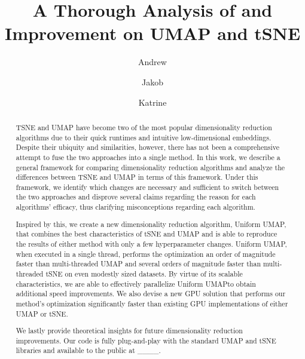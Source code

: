 \documentclass[sigconf, nonacm]{acmart}
\newcommand\ourmethod{Uniform UMAP}
\begin{document}
\title{A Thorough Analysis of and Improvement on UMAP and tSNE}

\author{Andrew}
\author{Jakob}
\author{Katrine}
\begin{abstract}
TSNE and UMAP have become two of the most popular dimensionality reduction algorithms due to their quick runtimes and intuitive low-dimensional embeddings.
Despite their ubiquity and similarities, however, there has not been a comprehensive attempt to fuse the two approaches into a single method. In this work, we
describe a general framework for comparing dimensionality reduction algorithms and analyze the differences between TSNE and UMAP in terms of this framework.
Under this framework, we identify which changes are necessary and sufficient to switch between the two approaches and disprove several claims regarding the
reason for each algorithms' efficacy, thus clarifying misconceptions regarding each algorithm.

Inspired by this, we create a new dimensionality reduction algorithm, \ourmethod, that combines the best characteristics of tSNE
and UMAP and is able to reproduce the results of either method with only a few hyperparameter changes. \ourmethod, when executed in a single thread, performs the optimization an order of magnitude faster than
multi-threaded UMAP and several orders of magnitude faster than multi-threaded tSNE on even modestly sized datasets. By virtue of its scalable characteristics,
we are able to effectively parallelize \ourmethod to obtain additional speed improvements. We also devise a new GPU
solution that performs our method's optimization significantly faster than existing GPU implementations of either UMAP or tSNE.

We lastly provide theoretical insights for future dimensionality reduction improvements. Our code is fully plug-and-play with the standard UMAP and tSNE
libraries and available to the public at \_\_\_\_.
\end{abstract}

\maketitle
\end{document}

